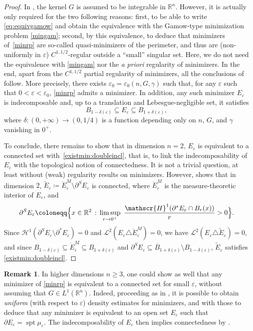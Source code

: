 \documentclass[JEP,XML,SOM,Unicode,published]{cedram}
\newcommand{\sep}{\,:\,}
\newcommand{\enquote}[1]{``#1''}
\numberwithin{equation}{section}
\theoremstyle{plain}
\theoremstyle{definition}
\newtheorem{rmk}[thm]{Remark}
\newcommand{\numberset}[1]{{\mathbb{#1}}}
\newcommand{\R}{\numberset{R}}
\newcommand{\calH}{{\mathscr{H}}}
\newcommand{\calL}{{\mathscr{L}}}
\let\eps\varepsilon
\let\ol\overline
\let\wt\widetilde
\newcommand{\Ren}{{\R^n}}
\newcommand{\subsq}{\subseteq}
\DeclareMathOperator{\spt}{\mathrm{spt}}
\begin{document}
\begin{proof}
In \cite{Peg2021}, the kernel $G$ is assumed to be integrable in $\Ren$. However, it
is actually only required for the two following reasons: first, to be able to write
\cref{eq:equivgamow} and obtain the equivalence with the Gamow-type minimization problem
\cref{mingam}; second, by this equivalence, to deduce that minimizers of~\cref{minrp} are so-called
quasi-minimizers of the perimeter, and thus are (non-uniformly in $\eps$)
$C^{1,1/2}$-regular outside a \enquote{small} singular set. Here, we do not need the
equivalence with \cref{mingam} nor the \emph{a priori} regularity of minimizers.
In the end, apart from the $C^{1,1/2}$ partial regularity of minimizers, all the conclusions
of \cite[Th.\,A \& B]{Peg2021} follow. More precisely, there exists
$\eps_0=\eps_0(n,G,\gamma)$ such that, for any $\eps$ such that $0<\eps<\eps_0$, \cref{minrp} admits a minimizer.
In addition, any such minimizer $E_\eps$ is indecomposable and, up to a translation and
Lebesgue-negligible set, it satisfies
\[
B_{1-\delta(\eps)} \subsq E_\eps \subsq B_{1+\delta(\eps)},
\]
where $\delta:(0,+\infty)\to(0,1/4)$ is a function depending only on $n$, $G$, and $\gamma$
vanishing in $0^+$.

To conclude, there remains to show that in dimension $n=2$, $E_\eps$ is equivalent to a connected
set with~\cref{existmin:doubleincl}, that is, to link the indecomposability of $E_\eps$ with the
topological notion of connectedness. It is not a trivial question, at least without (weak)
regularity results on minimizers.
However, \cite[Th.\,8]{ACMM2001} shows that in dimension $2$, $\wt{E}_\eps\coloneqq
\mathring{E}^M_\eps\setminus\partial^S E_\eps$ is connected, where $\mathring{E}^M_\eps$ is the
measure-theoretic interior of $E_\eps$, and
\[
\partial^S E_\eps\coloneqq \Bigl\{ x\in\R^2\sep  \limsup_{r\to 0^+}~ \frac{\calH^{1}(\partial^* E_\eps
\cap B_r(x))}{r}>0\Bigr\}.
\]
Since $\calH^{1}(\partial^S E_\eps\setminus\partial^* E_\eps)=0$ and
$\calL^2(E_\eps\triangle \mathring{E}_\eps^M)=0$, we have $\calL^2(E_\eps\triangle\wt{E}_\eps)=0$,
and since $B_{1-\delta(\eps)}\subsq\mathring{E}^M_\eps\subsq B_{1+\delta(\eps)}$ and $\partial^S
E_\eps \subsq \ol{B}_{1+\delta(\eps)}\setminus B_{1-\delta(\eps)}$, $\wt{E}_\eps$ satisfies
\cref{existmin:doubleincl}.
\end{proof}

\begin{rmk}
In higher dimensions $n\geq 3$, one could show as well that any minimizer of \cref{minrp} is
equivalent to a connected set for small $\eps$, without assuming that $G\in L^1(\Ren)$. Indeed,
proceeding \eg as in \cite[Lem.\,5.6]{MS2019}, it is possible to obtain \emph{uniform}
(with respect to $\eps$) density estimates for minimizers, and with those to deduce that any minimizer is
equivalent to an open set $E_\eps$ such that $\partial E_\eps=\spt \mu_\eps$. The indecomposability of
$E_\eps$ then implies connectedness by \cite{ACMM2001}.
\end{rmk}
\end{document}
